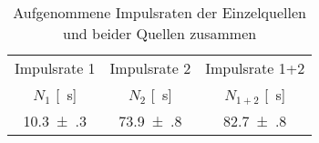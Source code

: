 \begin{table}[!h]
	\centering
	\begin{tabular}{|c|c|c|}
		\hline
		Impulsrate 1 & Impulsrate 2 & Impulsrate 1+2\\
		$N_1$ [\si{\per\second}] & $N_2$ [\si{\per\second}] & $N_{1+2}$ [\si{\per\second}]\\
\hline\hline
		\num{10.3(3)} & \num{73.9(8)} & \num{82.7(8)}\\
		\hline
	\end{tabular}
	\caption{Aufgenommene Impulsraten der Einzelquellen und beider Quellen zusammen \label{tab:Auswertung_Totzeit}}
\end{table}
